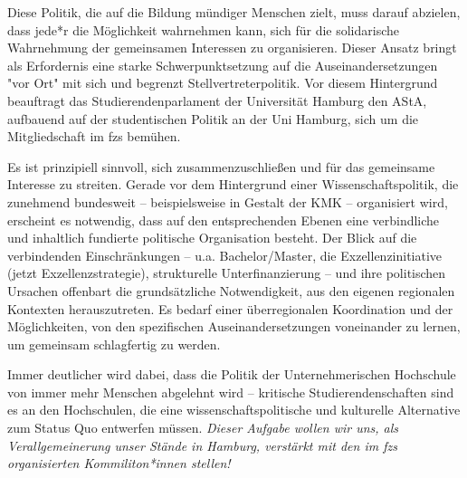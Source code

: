 \documentclass[ngerman,headheight=70pt]{scrartcl}
\begin{document}
    Diese Politik, die auf die Bildung mündiger Menschen zielt, muss darauf abzielen,
    dass jede*r die Möglichkeit wahrnehmen kann, sich für die solidarische
    Wahrnehmung der gemeinsamen Interessen zu organisieren. Dieser Ansatz bringt
    als Erfordernis eine starke Schwerpunktsetzung auf die Auseinandersetzungen
    "vor Ort" mit sich und begrenzt Stellvertreterpolitik. Vor diesem Hintergrund
    beauftragt das Studierendenparlament der Universität Hamburg den AStA,
    aufbauend auf der studentischen Politik an der Uni Hamburg, sich um die
    Mitgliedschaft im fzs bemühen.

    Es ist prinzipiell sinnvoll, sich
    zusammenzuschließen und für das gemeinsame Interesse zu streiten. Gerade vor
    dem Hintergrund einer Wissenschaftspolitik, die zunehmend bundesweit --
    beispielsweise in Gestalt der KMK – organisiert wird, erscheint es notwendig,
    dass auf den entsprechenden Ebenen eine verbindliche und inhaltlich fundierte
    politische Organisation besteht. Der Blick auf die verbindenden Einschränkungen
    -- u.a. Bachelor/Master, die Exzellenzinitiative (jetzt Exzellenzstrategie),
    strukturelle Unterfinanzierung -- und ihre politischen Ursachen offenbart die
    grundsätzliche Notwendigkeit, aus den eigenen regionalen Kontexten
    herauszutreten. Es bedarf einer überregionalen Koordination und der
    Möglichkeiten, von den spezifischen Auseinandersetzungen voneinander zu
    lernen, um gemeinsam schlagfertig zu werden.

    Immer deutlicher wird dabei, dass die Politik der Unternehmerischen Hochschule
    von immer mehr Menschen abgelehnt wird – kritische Studierendenschaften sind
    es an den Hochschulen, die eine wissenschaftspolitische und kulturelle
    Alternative zum Status Quo entwerfen müssen.
    \textit{Dieser Aufgabe wollen wir uns, als Verallgemeinerung unser Stände in
    Hamburg, verstärkt mit den im fzs organisierten Kommiliton*innen stellen!}
\end{document}
